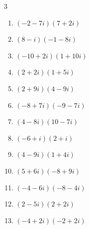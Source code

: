\begin{multicols}{3}
\begin{enumerate}
        \phantom{$\displaystyle =58-33i$}

  \item $\displaystyle (-2-7i)(7+2i)$

        \phantom{$\displaystyle =-53i$}

  \item $\displaystyle (8-i)(-1-8i)$

        \phantom{$\displaystyle =-16-63i$}

  \item $\displaystyle (-10+2i)(1+10i)$

        \phantom{$\displaystyle =-30-98i$}

  \item $\displaystyle (2+2i)(1+5i)$

        \phantom{$\displaystyle =-8+12i$}

  \item $\displaystyle (2+9i)(4-9i)$

        \phantom{$\displaystyle =89+18i$}

  \item $\displaystyle (-8+7i)(-9-7i)$

        \phantom{$\displaystyle =121-7i$}

  \item $\displaystyle (4-8i)(10-7i)$

        \phantom{$\displaystyle =-16-108i$}

  \item $\displaystyle (-6+i)(2+i)$

        \phantom{$\displaystyle =-13-4i$}

  \item $\displaystyle (4-9i)(1+4i)$

        \phantom{$\displaystyle =40+7i$}

  \item $\displaystyle (5+6i)(-8+9i)$

        \phantom{$\displaystyle =-94-3i$}

  \item $\displaystyle (-4-6i)(-8-4i)$

        \phantom{$\displaystyle =8+64i$}

  \item $\displaystyle (2-5i)(2+2i)$

        \phantom{$\displaystyle =14-6i$}

  \item $\displaystyle (-4+2i)(-2+2i)$


\end{enumerate}
\end{multicols}
